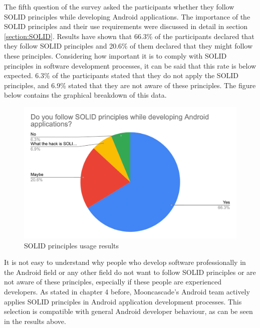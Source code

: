 The fifth question of the survey asked the participants whether they follow SOLID principles while developing Android applications. The importance of the SOLID principles and their use requirements were discussed in detail in section \ref{section:SOLID}. Results have shown that 66.3\% of the participants declared that they follow SOLID principles and 20.6\% of them declared that they might follow these principles. Considering how important it is to comply with SOLID principles in software development processes, it can be said that this rate is below expected. 6.3\% of the participants stated that they do not apply the SOLID principles, and 6.9\% stated that they are not aware of these principles. The figure below contains the graphical breakdown of this data.
\begin{figure}[ht!]
    \centering
    \includegraphics[scale=0.25]{figures/solid.png}
    \caption{SOLID principles usage results}
    \label{fig:solid}
\end{figure}
\FloatBarrier

It is not easy to understand why people who develop software professionally in the Android field or any other field do not want to follow SOLID principles or are not aware of these principles, especially if these people are experienced developers. As stated in chapter 4 before, Mooncascade's Android team actively applies SOLID principles in Android application development processes. This selection is compatible with general Android developer behaviour, as can be seen in the results above.

